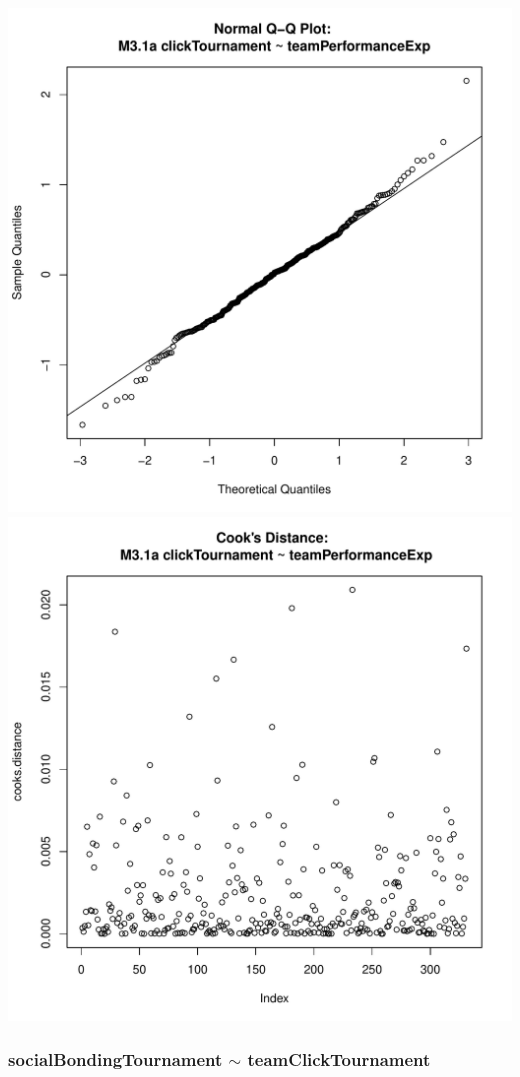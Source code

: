 \documentclass[12pt]{report}
\begin{document}
\includegraphics[scale =.4]{../images/MLM31aQQNorm.pdf}
\includegraphics[scale =.4]{../images/MLM31aCooksD.pdf}

\newpage
\subsubsection{socialBondingTournament $\sim$ teamClickTournament}
\end{document}

